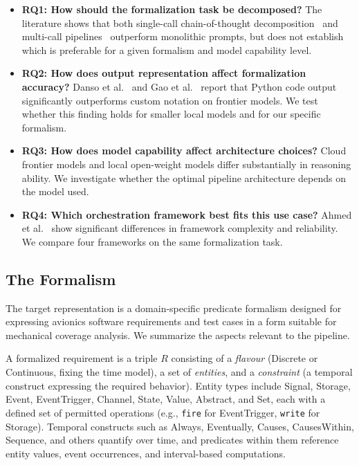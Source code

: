 \begin{itemize}
\item \textbf{RQ1: How should the formalization task be decomposed?}
The literature shows that both single-call chain-of-thought
decomposition~\cite{ma2025req2ltl} and multi-call
pipelines~\cite{nouri2024safety,khot2022decomposed} outperform monolithic
prompts, but does not establish which is preferable for a given formalism
and model capability level.

\item \textbf{RQ2: How does output representation affect formalization
accuracy?} Danso et al.~\cite{danso2026syntax} and Gao
et al.~\cite{gao2022pal} report that Python code output significantly
outperforms custom notation on frontier models. We test whether this
finding holds for smaller local models and for our specific formalism.

\item \textbf{RQ3: How does model capability affect architecture
choices?} Cloud frontier models and local open-weight models differ
substantially in reasoning ability. We investigate whether the optimal
pipeline architecture depends on the model used.

\item \textbf{RQ4: Which orchestration framework best fits this use
case?} Ahmed et al.~\cite{ahmed2026ddl2propbank} show significant
differences in framework complexity and reliability. We compare four
frameworks on the same formalization task.
\end{itemize}

\subsection{The Formalism}
\label{sec:formalism}

The target representation is a domain-specific predicate formalism
designed for expressing avionics software requirements and test cases in
a form suitable for mechanical coverage analysis. We summarize the
aspects relevant to the pipeline.

A formalized requirement is a triple $R$ consisting of a
\textit{flavour} (Discrete or Continuous, fixing the time model), a set
of \textit{entities}, and a \textit{constraint} (a temporal construct
expressing the required behavior). Entity types include Signal, Storage, Event, EventTrigger,
Channel, State, Value, Abstract, and Set, each with a defined set of
permitted operations (e.g., \texttt{fire} for EventTrigger,
\texttt{write} for Storage). Temporal constructs such as Always,
Eventually, Causes, CausesWithin, Sequence, and others quantify over
time, and predicates within them reference entity values, event
occurrences, and interval-based computations.


